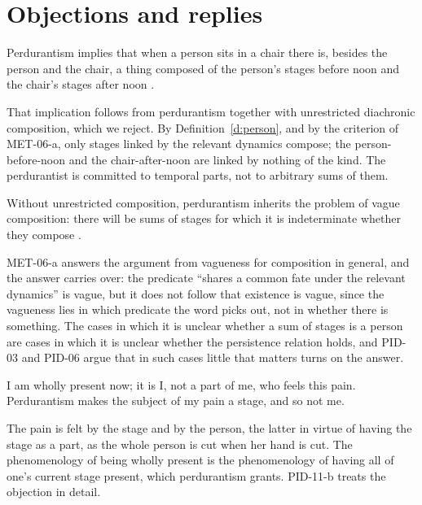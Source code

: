 \documentclass{situationist-preprint}
\begin{document}
\section{Objections and replies}\label{s:obj}

\begin{objection}
Perdurantism implies that when a person sits in a chair there is, besides the person and the chair, a thing composed of the person's stages before noon and the chair's stages after noon \citep{Thomson1983}.
\end{objection}

\begin{reply}
That implication follows from perdurantism together with unrestricted diachronic composition, which we reject. By Definition~\ref{d:person}, and by the criterion of MET-06-a, only stages linked by the relevant dynamics compose; the person-before-noon and the chair-after-noon are linked by nothing of the kind. The perdurantist is committed to temporal parts, not to arbitrary sums of them.
\end{reply}

\begin{objection}
Without unrestricted composition, perdurantism inherits the problem of vague composition: there will be sums of stages for which it is indeterminate whether they compose \citep{Sider2001}.
\end{objection}

\begin{reply}
MET-06-a answers the argument from vagueness for composition in general, and the answer carries over: the predicate \enquote{shares a common fate under the relevant dynamics} is vague, but it does not follow that existence is vague, since the vagueness lies in which predicate the word picks out, not in whether there is something. The cases in which it is unclear whether a sum of stages is a person are cases in which it is unclear whether the persistence relation holds, and PID-03 and PID-06 argue that in such cases little that matters turns on the answer.
\end{reply}

\begin{objection}
I am wholly present now; it is I, not a part of me, who feels this pain. Perdurantism makes the subject of my pain a stage, and so not me.
\end{objection}

\begin{reply}
The pain is felt by the stage and by the person, the latter in virtue of having the stage as a part, as the whole person is cut when her hand is cut. The phenomenology of being wholly present is the phenomenology of having all of one's current stage present, which perdurantism grants. PID-11-b treats the objection in detail.
\end{reply}
\end{document}
